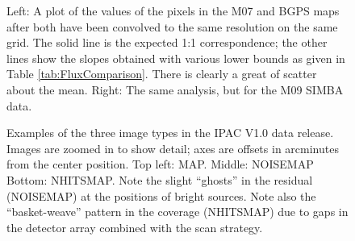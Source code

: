 \documentclass[12pt,preprint]{aastex}
\def\Figure#1#2#3#4{
\begin{figure}[htb]
\epsscale{#4}
\plotone{#1}
\caption{#2}
\label{#3}
\end{figure}
}
\def\FigureTwo#1#2#3#4#5{
\begin{figure}[htb]
\epsscale{#5}
\plottwo{#1}{#2}
\caption{#3}
\label{#4}
\end{figure}
}
\begin{document}
\FigureTwo{f17a}{f17b}
{Left: A plot of the values of the pixels in the M07 and BGPS maps
after both have been convolved to the same resolution on the same
grid.  The solid line is the expected 1:1 correspondence; the other
lines show the slopes obtained with various lower bounds as given in
Table \ref{tab:FluxComparison}.  There is clearly a great of scatter
about the mean.  Right: The same analysis, but for the M09 SIMBA
data.}{fig:FluxComparison}{1.0}

\Figure{f18} {Examples of the three image types in the IPAC V1.0 data
release.  Images are zoomed in to show detail; axes are offsets in
arcminutes from the center position.  Top left: MAP.  Middle: NOISEMAP
Bottom: NHITSMAP.  Note the slight ``ghosts'' in the residual
(NOISEMAP) at the positions of bright sources.  Note also the
``basket-weave'' pattern in the coverage (NHITSMAP) due to gaps in the
detector array combined with the scan
strategy.}{fig:SampleImages}{1.0}
\end{document}
